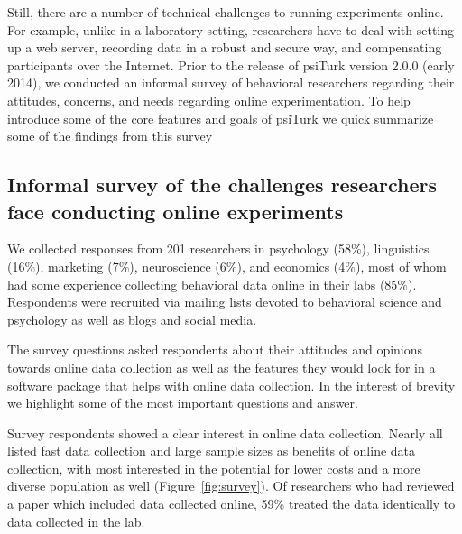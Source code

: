 \documentclass[twocolumn]{svjour3}          %
\begin{document}
Still, there are a number of technical challenges to running experiments online.
For example, unlike in a laboratory setting, researchers have to 
deal with setting up a web server, recording data in a robust and secure way, 
and compensating participants over the Internet.  
Prior to the release of \textsf{psiTurk} version
2.0.0 (early 2014), we conducted an informal survey of behavioral researchers 
regarding their attitudes, concerns, and needs regarding online experimentation. 
To help introduce some of the core features and goals of \textsf{psiTurk} we 
quick summarize some of the findings from this survey



\subsection{Informal survey of the challenges researchers face conducting online experiments}
 We collected responses from 201 researchers in psychology (58\%),
linguistics (16\%), marketing (7\%), neuroscience (6\%), and economics (4\%), most of 
whom had some experience collecting behavioral data online in their labs (85\%).  
Respondents were recruited via mailing lists devoted to behavioral science and psychology 
as well as blogs and social media. 

The survey questions asked respondents about their attitudes and opinions towards
online data collection as well as the features they would look for in a software package
that helps with online data collection.  In the interest of brevity we highlight some of the
most important questions and answer.

Survey respondents showed a clear interest in online data collection. Nearly all listed fast data
collection and large sample sizes as benefits of online data collection, with most
interested in the potential for lower costs and a more diverse population as well 
(Figure~\ref{fig:survey}). Of researchers who had reviewed a paper which included data 
collected online, 59\% treated the data identically to data collected in the lab.


\end{document}
